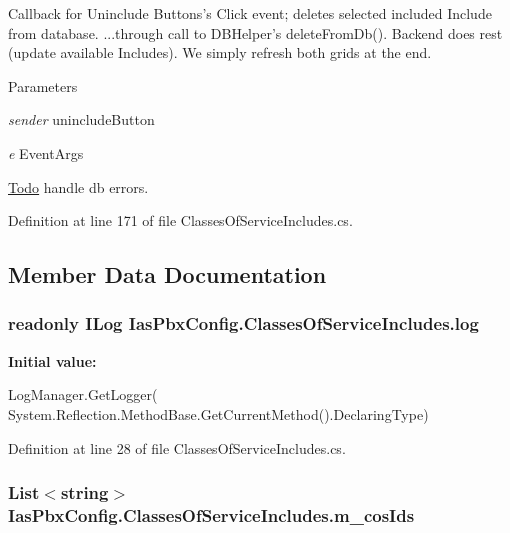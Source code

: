Callback for Uninclude Buttons's Click event; deletes selected included Include from database. ...through call to DBHelper's deleteFromDb(). Backend does rest (update available Includes). We simply refresh both grids at the end. 
\begin{DoxyParams}{Parameters}
\item[{\em sender}]unincludeButton \item[{\em e}]EventArgs \end{DoxyParams}
\begin{Desc}
\item[\hyperlink{todo__todo000011}{Todo}]handle db errors. \end{Desc}


Definition at line 171 of file ClassesOfServiceIncludes.cs.

\subsection{Member Data Documentation}
\hypertarget{class_ias_pbx_config_1_1_classes_of_service_includes_ad1e2f3e94e3693fcc43a769bbfd3a203}{
\subsubsection[{log}]{\setlength{\rightskip}{0pt plus 5cm}readonly ILog {\bf IasPbxConfig.ClassesOfServiceIncludes.log}}}
\label{class_ias_pbx_config_1_1_classes_of_service_includes_ad1e2f3e94e3693fcc43a769bbfd3a203}
{\bfseries Initial value:}
\begin{DoxyCode}
 LogManager.GetLogger(
            System.Reflection.MethodBase.GetCurrentMethod().DeclaringType)
\end{DoxyCode}


Definition at line 28 of file ClassesOfServiceIncludes.cs.\hypertarget{class_ias_pbx_config_1_1_classes_of_service_includes_aa035102cce05d98ea04f1efa76ba8038}{
\subsubsection[{m\_\-cosIds}]{\setlength{\rightskip}{0pt plus 5cm}List$<$string$>$ {\bf IasPbxConfig.ClassesOfServiceIncludes.m\_\-cosIds}}}
\label{class_ias_pbx_config_1_1_classes_of_service_includes_aa035102cce05d98ea04f1efa76ba8038}


